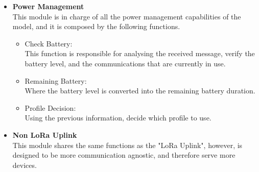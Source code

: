 \begin{itemize}
   \item \textbf{Power Management}\\
   This module is in charge of all the power management capabilities of the model, and it is composed by the following functions. 
   \begin{itemize}
     \item Check Battery: \\This function is responsible for analysing the received message, verify the battery level, and the communications that are currently in use. 
   \end{itemize}
   \begin{itemize}
     \item Remaining Battery: \\Where the battery level is converted into the remaining battery duration.
   \end{itemize}
   \begin{itemize}
     \item Profile Decision: \\Using the previous information, decide which profile to use.
   \end{itemize}
\end{itemize}


\begin{itemize}
   \item \textbf{Non LoRa Uplink} \\
    This module shares the same functions as the "LoRa Uplink", however, is designed to be more communication agnostic, and therefore serve more devices. 
\end{itemize}


